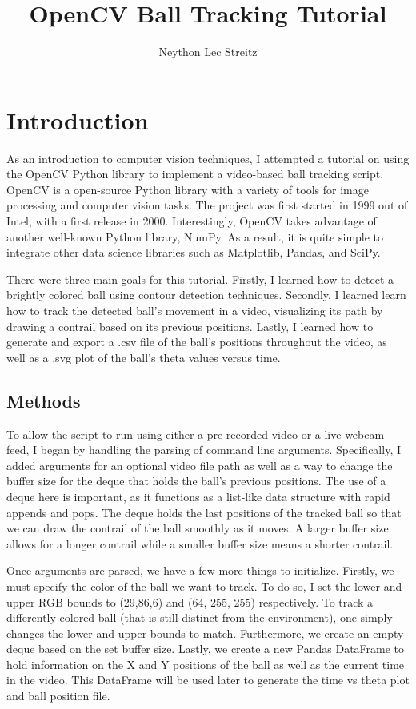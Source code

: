 \documentclass[10pt,twocolumn]{article}
\title{OpenCV Ball Tracking Tutorial}
\author{Neython Lec Streitz}
\affiliation{Occidental College}
\begin{document}
\maketitle

\section{Introduction}
As an introduction to computer vision techniques, I attempted a tutorial on using the OpenCV Python library to implement a video-based ball tracking script.
OpenCV is a open-source Python library with a variety of tools for image processing and computer vision tasks.
The project was first started in 1999 out of Intel, with a first release in 2000.
Interestingly, OpenCV takes advantage of another well-known Python library, NumPy.
As a result, it is quite simple to integrate other data science libraries such as Matplotlib, Pandas, and SciPy. \par

There were three main goals for this tutorial.
Firstly, I learned how to detect a brightly colored ball using contour detection techniques.
Secondly, I learned learn how to track the detected ball's movement in a video, visualizing its path by drawing a contrail based on its previous positions.
Lastly, I learned how to generate and export a .csv file of the ball's positions throughout the video, as well as a .svg plot of the ball's theta values versus time. \par

\subsection{Methods}
To allow the script to run using either a pre-recorded video or a live webcam feed, I began by handling the parsing of command line arguments.
Specifically, I added arguments for an optional video file path as well as a way to change the buffer size for the deque that holds the ball's previous positions.
The use of a deque here is important, as it functions as a list-like data structure with rapid appends and pops.
The deque holds the last positions of the tracked ball so that we can draw the contrail of the ball smoothly as it moves.
A larger buffer size allows for a longer contrail while a smaller buffer size means a shorter contrail. \par

Once arguments are parsed, we have a few more things to initialize.
Firstly, we must specify the color of the ball we want to track.
To do so, I set the lower and upper RGB bounds to (29,86,6) and (64, 255, 255) respectively.
To track a differently colored ball (that is still distinct from the environment), one simply changes the lower and upper bounds to match.
Furthermore, we create an empty deque based on the set buffer size.
Lastly, we create a new Pandas DataFrame to hold information on the X and Y positions of the ball as well as the current time in the video.
This DataFrame will be used later to generate the time vs theta plot and ball position file. \par
\end{document}
